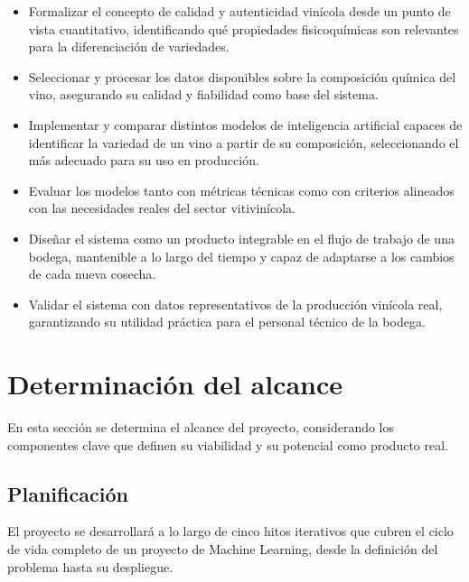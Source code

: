 \begin{itemize}
    \item Formalizar el concepto de calidad y autenticidad vinícola desde un punto de 
    vista cuantitativo, identificando qué propiedades fisicoquímicas son relevantes 
    para la diferenciación de variedades.
    
    \item Seleccionar y procesar los datos disponibles sobre la composición química del 
    vino, asegurando su calidad y fiabilidad como base del sistema.
    
    \item Implementar y comparar distintos modelos de inteligencia artificial capaces de 
    identificar la variedad de un vino a partir de su composición, seleccionando el más 
    adecuado para su uso en producción.
    
    \item Evaluar los modelos tanto con métricas técnicas como con criterios alineados con 
    las necesidades reales del sector vitivinícola.
    
    \item Diseñar el sistema como un producto integrable en el flujo de trabajo de una bodega, 
    mantenible a lo largo del tiempo y capaz de adaptarse a los cambios de cada nueva cosecha.
    
    \item Validar el sistema con datos representativos de la producción vinícola real, 
    garantizando su utilidad práctica para el personal técnico de la bodega.
\end{itemize}

\section{Determinación del alcance}

En esta sección se determina el alcance del proyecto, considerando los componentes clave 
que definen su viabilidad y su potencial como producto real.

\subsection{Planificación}

El proyecto se desarrollará a lo largo de cinco hitos iterativos que cubren el ciclo de vida 
completo de un proyecto de Machine Learning, desde la definición del problema hasta su 
despliegue.

